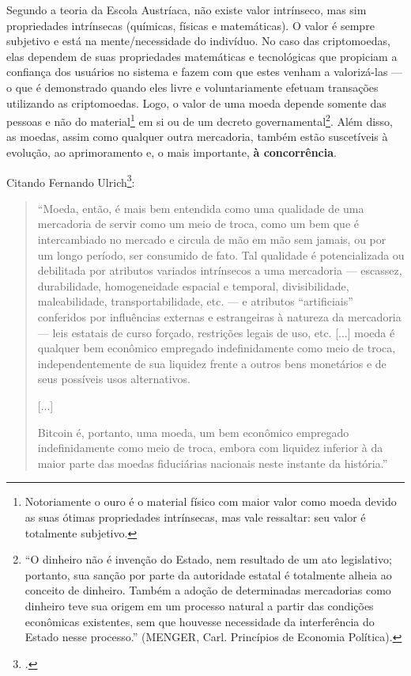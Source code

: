 Segundo a teoria da Escola Austríaca, não existe valor intrínseco, mas sim propriedades intrínsecas (químicas, físicas e matemáticas). O valor é sempre subjetivo e está na mente/necessidade do indivíduo. No caso das criptomoedas, elas dependem de suas propriedades matemáticas e tecnológicas que propiciam a confiança dos usuários no sistema e fazem com que estes venham a valorizá-las --- o que é demonstrado quando eles livre e voluntariamente efetuam transações utilizando as criptomoedas. Logo, o valor de uma moeda depende somente das pessoas e não do material\footnote{Notoriamente o ouro é o material físico com maior valor como moeda devido as suas ótimas propriedades intrínsecas, mas vale ressaltar: seu valor é totalmente subjetivo.} em si ou de um decreto governamental\footnote{``O dinheiro não é invenção do Estado, nem resultado de um ato legislativo; portanto, sua sanção por parte da autoridade estatal é totalmente alheia ao conceito de dinheiro. Também a adoção de determinadas mercadorias como dinheiro teve sua origem em um processo natural a partir das condições econômicas existentes, sem que houvesse necessidade da interferência do Estado nesse processo.'' (MENGER, Carl. Princípios de Economia Política).}. Além disso, as moedas, assim como qualquer outra mercadoria, também estão suscetíveis à evolução, ao aprimoramento e, o mais importante, \textbf{à concorrência}.

Citando Fernando Ulrich\footnote{\cite[p. 88-89, 91]{bib:fernando-ulrich}.}:
\begin{quote}
``Moeda, então, é mais bem entendida como uma qualidade de uma mercadoria de servir como um meio de troca, como um bem que é intercambiado no mercado e circula de mão em mão sem jamais, ou por um longo período, ser consumido de fato. Tal qualidade é potencializada ou debilitada por atributos variados intrínsecos a uma mercadoria --- escassez, durabilidade, homogeneidade espacial e temporal, divisibilidade, maleabilidade, transportabilidade, etc. --- e atributos ``artificiais'' conferidos por influências externas e estrangeiras à natureza da mercadoria --- leis estatais de curso forçado, restrições legais de uso, etc. [...] moeda é qualquer bem econômico empregado indefinidamente como meio de troca, independentemente de sua liquidez frente a outros bens monetários e de seus possíveis usos alternativos.

[...]

Bitcoin é, portanto, uma moeda, um bem econômico empregado indefinidamente como meio de troca, embora com liquidez inferior à da maior parte das moedas fiduciárias nacionais neste instante da história.''
\end{quote}

